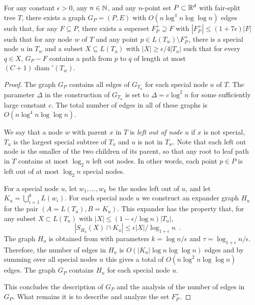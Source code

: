 \documentclass{patmorin}
\DeclareMathOperator{\diam}{diam}
\begin{document}
\begin{lem}
  For any constant $\epsilon >0$, any $n\in\mathbb{N}$, and any $n$-point
  set $P\subset\mathbb{R}^d$ with fair-split tree $T$, there exists a graph
  $G_P=(P,E)$ with $O(n\log^4 n\log\log n)$ edges such that, for any 
  $F\subseteq
  P$, there exists a superset $F^+_P\supseteq F$ with $|F^+_P|\le
  (1+7\epsilon)|F|$ such that for any node $w$ of $T$ and any point
  $p\in L(T_w)\setminus F^+_P$, there is a special node $u$ in $T_w$
  and a subset $X\subseteq L(T_u)$
  with $|X|\ge \epsilon/4|T_u|$ such that for every $q\in X$, $G_P-F$
  contains a path from $p$ to $q$ of length at most $(C+1)\diam'(T_w)$.
\end{lem}


\begin{proof}
  The graph $G_P$ contains all edges of $G_{T_u}$ for each special node
  $u$ of $T$.  The parameter $\Delta$ in the construction of $G_{T_u}$
  is set to $\Delta=c\log^2 n$ for some sufficiently large constant $c$.
  The total number of edges in all of these graphs is $O(n\log^4
  n\log\log n)$.  

  We say that a node $w$ with parent $x$ in $T$ is \emph{left out of
  node $u$} if $x$ is not special, $T_u$ is the largest special subtree
  of $T_x$ and $u$ is not in $T_w$. Note that each left out node is the
  smaller of the two children of its parent, so that any root to leaf
  path in $T$ contains at most $\log_2 n$ left out nodes.  In other words,
  each point $p\in P$ is left out of at most $\log_2 n$ special nodes.
	
  For a special node $u$, let $w_1,\ldots,w_k$ be the nodes left out of $u$, and  let $K_u=\bigcup_{i=1}^k L(w_i)$.  For each special node $u$ we construct
  an expander graph $H_u$ for the pair
  $(A=L(T_u),B=K_u)$. This expander has the property that, for any
  subset $X\subset L(T_u)$ with $|X|\le (1-\epsilon/\log n)|T_u|$, 
  \[ |S_{H_u}(X)\cap K_u| \le \epsilon|X|/\log_{1+\epsilon} n \enspace . \] 
  The graph $H_u$ is obtained from  with parameters
  $k=\log n/\epsilon$ and $\tau=\log_{1+\epsilon}n/\epsilon$.  Therefore,
  the number of edges in $H_u$ is $O(|K_u|\log n\log\log n)$ edges and
  by summing over all special nodes $u$ this gives a total of $O(n\log^2
  n\log\log n)$ edges.  The graph $G_P$ contains $H_u$ for each special
  node $u$.

  This concludes the description of $G_P$ and the analysis of the number
  of edges in $G_P$. What remains it is to describe and analyze the
  set $F^+_P$.



\end{proof}
\end{document}
